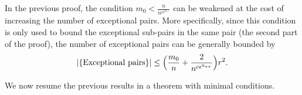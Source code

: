         \begin{remark}
            In the previous proof, the condition $m_0 < \frac{n}{n^{c\epsilon^{k_{**}}}}$ can be
            weakened at the cost of increasing the number of exceptional pairs.
            More specifically, since this condition is only used to bound the exceptional sub-pairs in the same pair
            (the second part of the proof), the number of exceptional pairs can be generally bounded by
            \[
                |\{ \text{Exceptional pairs} \}|
                    \leq \Bigl( \frac{m_0}{n} + \frac{2}{n^{c\epsilon^{k_{**}}}} \Bigr) r^2.
            \]
        \end{remark}

        We now resume the previous results in a theorem with minimal conditions.


